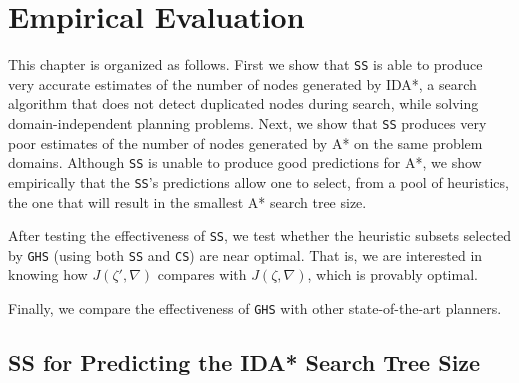 

%

\chapter{Empirical Evaluation}\label{ch:empirical_evaluation}


\noindent
This chapter is organized as follows. First we show that \texttt{SS} is able to produce very accurate estimates of the number of nodes generated by IDA*, a search algorithm that does not detect duplicated nodes during search, while solving domain-independent planning problems. Next, we show that \texttt{SS} produces very poor estimates of the number of nodes generated by A* on the same problem domains. Although \texttt{SS} is unable to produce good predictions for A*, we show empirically that the \texttt{SS}'s predictions allow one to select, from a pool of heuristics, the one that will result in the smallest A* search tree size. 

After testing the effectiveness of \texttt{SS}, we test whether the heuristic subsets selected by \texttt{GHS} (using both \texttt{SS} and \texttt{CS}) are near optimal. That is, we are interested in knowing how $J(\zeta', \nabla)$ compares with $J(\zeta, \nabla)$, which is provably optimal. 

Finally, we compare the effectiveness of \texttt{GHS} with other state-of-the-art planners. 

\section{SS for Predicting the IDA* Search Tree Size}

